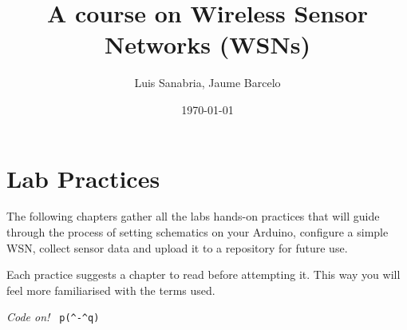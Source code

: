 \documentclass[12pt]{book}
\begin{document}
\frontmatter
\pagestyle{empty}
\title{\textbf{A course on Wireless Sensor Networks (WSNs)}}
\author{Luis Sanabria, Jaume Barcelo}
\date{\today}
\maketitle
%
\tableofcontents
%
\mainmatter
%



%


\chapter*{Lab Practices}\label{practices}

The following chapters gather all the labs hands-on practices that will guide through the process of setting schematics on your Arduino, configure a simple WSN, collect sensor data and upload it to a repository for future use.

Each practice suggests a chapter to read before attempting it. This way you will feel more familiarised with the terms used.

\emph{Code on!} \verb! p(^-^q)!


	
	
	
	
	
    
    
    
    
    
    
    
    \backmatter
%


\end{document}
